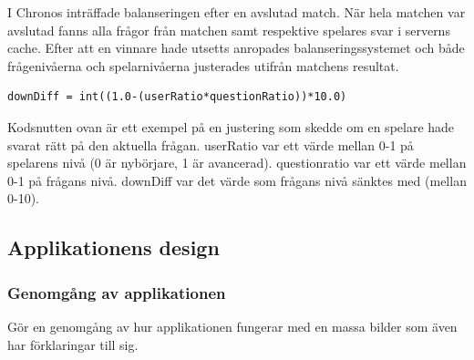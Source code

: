 \documentclass[a4paper, 11pt]{article}
\begin{document}
I Chronos inträffade balanseringen efter en avslutad match. När hela matchen var avslutad fanns alla frågor från matchen samt respektive spelares svar i serverns cache. Efter att en vinnare hade utsetts anropades balanseringssystemet och både frågenivåerna och spelarnivåerna justerades utifrån matchens resultat.

\begin{verbatim}
downDiff = int((1.0-(userRatio*questionRatio))*10.0)
\end{verbatim}

Kodsnutten ovan är ett exempel på en justering som skedde om en spelare hade svarat rätt på den aktuella frågan. userRatio var ett värde mellan 0-1 på spelarens nivå (0 är nybörjare, 1 är avancerad). questionratio var ett värde mellan 0-1 på frågans nivå. downDiff var det värde som frågans nivå sänktes med (mellan 0-10). 

\pagebreak
\subsection{Applikationens design}

\subsubsection{Genomgång av applikationen}
Gör en genomgång av hur applikationen fungerar med en massa bilder som även har förklaringar till sig.
\end{document}
